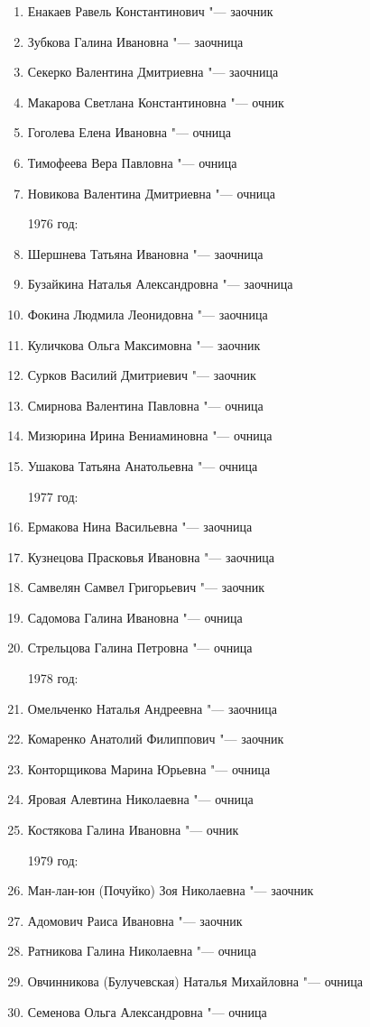 \begin{enumerate}[nosep]
{1975 год:}
	\item Енакаев Равель Константинович "--- заочник
	\item Зубкова Галина Ивановна "--- заочница
	\item Секерко Валентина Дмитриевна "--- заочница
	\item Макарова Светлана Константиновна "--- очник
	\item Гоголева Елена Ивановна "--- очница
	\item Тимофеева Вера Павловна "--- очница
	\item Новикова Валентина Дмитриевна "--- очница
	
{1976 год:}
	\item Шершнева Татьяна Ивановна "--- заочница
	\item Бузайкина Наталья Александровна "--- заочница
	\item Фокина Людмила Леонидовна "--- заочница
	\item Куличкова Ольга Максимовна "--- заочник
	\item Сурков Василий Дмитриевич "--- заочник
	\item Смирнова Валентина Павловна "--- очница
	\item Мизюрина Ирина Вениаминовна "--- очница
	\item Ушакова Татьяна Анатольевна "--- очница
	
{1977 год:}
	\item Ермакова Нина Васильевна "--- заочница
	\item Кузнецова Прасковья Ивановна "--- заочница
	\item Самвелян Самвел Григорьевич "--- заочник
	\item Садомова Галина Ивановна "--- очница
	\item Стрельцова Галина Петровна "--- очница

{1978 год:}
	\item Омельченко Наталья Андреевна "--- заочница
	\item Комаренко Анатолий Филиппович "--- заочник
	\item Конторщикова Марина Юрьевна "--- очница
	\item Яровая Алевтина Николаевна "--- очница
	\item Костякова Галина Ивановна "--- очник

{1979 год:}
	\item Ман-лан-юн (Почуйко) Зоя Николаевна "--- заочник
	\item Адомович Раиса Ивановна "--- заочник
	\item Ратникова Галина Николаевна "--- очница
	\item Овчинникова (Булучевская) Наталья Михайловна "--- очница
	\item Семенова Ольга Александровна "--- очница


\end{enumerate}
